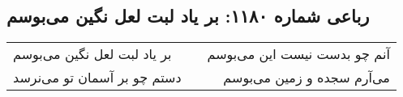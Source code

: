 \begin{center}
\section*{رباعی شماره ۱۱۸۰: بر یاد لبت لعل نگین می‌بوسم}
\label{sec:1180}
\begin{longtable}{l p{0.5cm} r}
بر یاد لبت لعل نگین می‌بوسم
&&
آنم چو بدست نیست این می‌بوسم
\\
دستم چو بر آسمان تو می‌نرسد
&&
می‌آرم سجده و زمین می‌بوسم
\\
\end{longtable}
\end{center}
